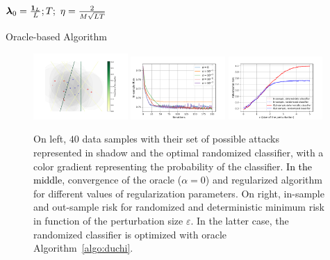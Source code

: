 \begin{algorithm}[ht]
\small
\SetAlgoLined
 $\bm{\lambda}_0 = \frac{\mathbf{1}_L}{L}; T;~\textcolor{black}{\eta=\frac{2}{M\sqrt{LT}}}$\\
 \caption{Oracle-based Algorithm}
 \label{algo:duchi}
\end{algorithm}
\begin{figure}[!ht]
    \centering
    \includegraphics[width=0.32\textwidth]{Images/illustration.pdf}  \includegraphics[width=0.32\textwidth]{Images/convergence_toy.pdf}     \includegraphics[width=0.32\textwidth]{Images/risk_toy.pdf}
    \caption{On left, $40$ data samples with their set of possible attacks represented in shadow and the optimal randomized classifier, with a color gradient representing the probability of the classifier. \textcolor{black}{In the middle}, convergence of the oracle ($\alpha=0$) and regularized algorithm for different values of regularization parameters. On right, in-sample and out-sample risk for randomized and deterministic minimum risk in function of the perturbation size $\varepsilon$. In the latter case, the randomized classifier is optimized with oracle Algorithm~\ref{algo:duchi}.}
    \label{fig:toy_example}
\end{figure}


